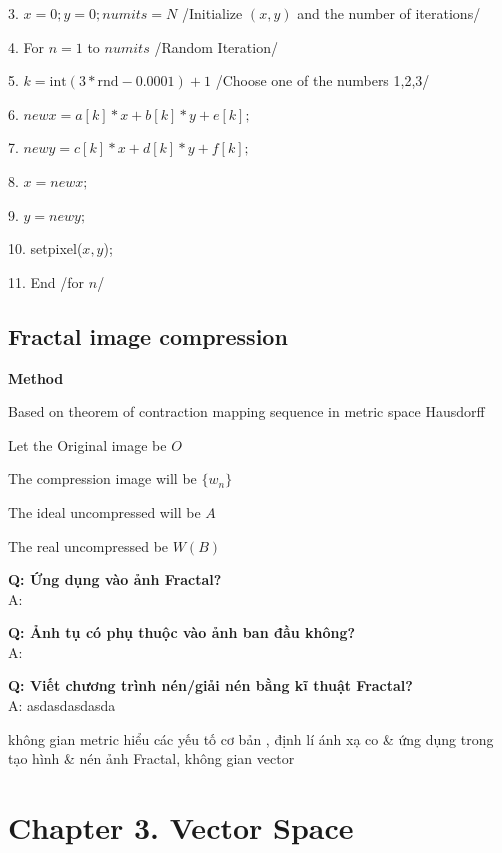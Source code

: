 3. $x=0; y=0; numits=N$ /Initialize $(x,y)$ and the number of iterations/

4. For $n=1$ to $numits$ /Random Iteration/

5. $k=\text{int}(3*\text{rnd}-0.0001)+1$ /Choose one of the numbers 1,2,3/

6. $newx=a[k]*x+b[k]*y+e[k];$

7. $newy=c[k]*x+d[k]*y+f[k];$

8. $x= newx;$

9. $y=newy;$

10. setpixel($x,y$);

11. End /for $n$/


\subsection {Fractal image compression}

\textbf{Method}

Based on theorem of contraction mapping sequence in metric space Hausdorff

Let the Original image be $O$

The compression image will be $\{ w_n \}$

The ideal uncompressed will be $A$

The real uncompressed be $W(B)$

\textbf{Q: Ứng dụng vào ảnh Fractal?}\\
A: 






















\textbf{Q: Ảnh tụ có phụ thuộc vào ảnh ban đầu không?}\\
A:

\textbf{Q: Viết chương trình nén/giải nén bằng kĩ thuật Fractal?}\\
A: asdasdasdasda

không gian metric hiểu các yếu tố cơ bản
, định lí ánh xạ co \& ứng dụng trong tạo hình \& nén ảnh Fractal, 
không gian vector

\section{Chapter 3. Vector Space}
